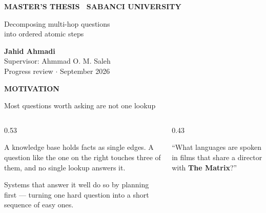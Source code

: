 \documentclass[aspectratio=169,11pt]{beamer}
\providecommand{\textls}[2][]{#2}
\newcommand{\lsp}[1]{\textls[140]{#1}}
\newcommand{\slidehead}[2]{%
  {\color{accent}\fontsize{6.8}{8}\selectfont\bfseries\lsp{#1}\par}%
  \vspace{2.4mm}%
  {\color{ink}\fontsize{15}{18}\selectfont #2\par}%
  \vspace{3.4mm}%
}
\newcommand{\calloutbg}[3]{%
  \par\vspace{2.6mm}%
  \begin{lrbox}{\cobox}%
    \begin{minipage}{\dimexpr\linewidth-9mm\relax}%
      \color{inktwo}\footnotesize #3%
    \end{minipage}%
  \end{lrbox}%
  \noindent{\setlength{\fboxsep}{0pt}%
    \colorbox{#1}{\raisebox{0pt}[\dimexpr\ht\cobox+2.2mm\relax][\dimexpr\dp\cobox+2.2mm\relax]{\rule{1.6pt}{0pt}}}%
    \colorbox{#2}{\raisebox{0pt}[\dimexpr\ht\cobox+2.2mm\relax][\dimexpr\dp\cobox+2.2mm\relax]{\hspace{3mm}\usebox{\cobox}\hspace{3mm}}}}%
  \par\vspace{2.6mm}%
}
\newcommand{\hlt}[1]{{\setlength{\fboxsep}{1pt}\colorbox{accentsoft}{\textcolor{accentink}{#1}}}}
\begin{document}
\begin{frame}[t]
\vspace{9mm}
{\color{muted}\fontsize{7.5}{9}\selectfont\bfseries\lsp{MASTER'S THESIS \textperiodcentered\ SABANCI UNIVERSITY}\par}
\vspace{6mm}
{\color{ink}\fontsize{26}{30}\selectfont
 Decomposing multi-hop questions\\into ordered atomic steps\par}
\vspace{7mm}
\vspace{7mm}

{\color{inktwo}\fontsize{9.5}{15}\selectfont
 {\color{ink}\bfseries Jahid Ahmadi}\\
 Supervisor: Ahmmad O. M. Saleh\\
 {\color{muted}Progress review $\cdot$ September 2026}\par}
\end{frame}

\begin{frame}[t]
\slidehead{MOTIVATION}{Most questions worth asking are not one lookup}
\begin{columns}[T,onlytextwidth]
\begin{column}{0.53\textwidth}
 {\color{inktwo}\small
  A knowledge base holds facts as single edges. A question like the one on the right
  touches three of them, and no single lookup answers it.\par}
 \vspace{3mm}
 {\color{inktwo}\small
  Systems that answer it well do so by \hlt{planning first} --- turning one hard
  question into a short sequence of easy ones.\par}
\end{column}
\begin{column}{0.43\textwidth}
 \vspace{-2.6mm}
 \calloutbg{accent}{sunk}{\normalsize ``What languages are spoken in films that share a
  director with \textbf{The Matrix}?''}
\end{column}
\end{columns}
\end{frame}
\end{document}
